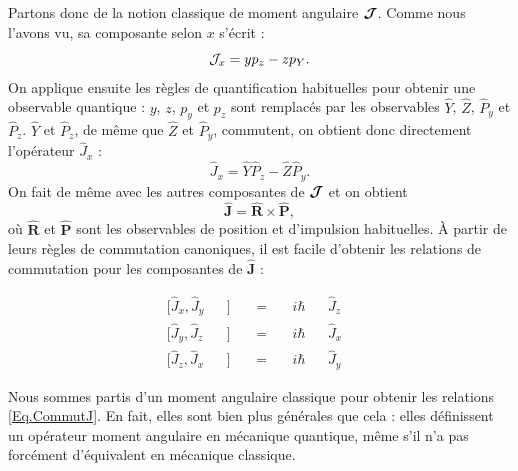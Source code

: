 Partons donc de la notion classique de moment angulaire $\bm{\mathcal{J}}$. Comme nous l'avons vu, sa composante selon $x$ s'écrit :
\begin{equation*}
\mathcal{J}_x=yp_z-zp_Y.
\end{equation*}
On applique ensuite les règles de quantification habituelles pour obtenir une observable quantique : $y$, $z$, $p_y$ et $p_z$ sont remplacés par les observables $\hat{Y}$, $\hat{Z}$, $\hat{P}_y$ et $\hat{P}_z$. $\hat{Y}$ et $\hat{P}_z$, de même que $\hat{Z}$ et $\hat{P}_y$, commutent, on obtient donc directement l'opérateur $\hat{J}_x$ :
\begin{equation*}
\hat{J}_x=\hat{Y}\hat{P}_z-\hat{Z}\hat{P}_y.
\end{equation*}
On fait de même avec les autres composantes de $\bm{\mathcal{J}}$ et on obtient 
\begin{equation*}
\bm{\hat{J}}=\bm{\hat{R}}\times\bm{\hat{P}},
\end{equation*}
où $\bm{\hat{R}}$ et $\bm{\hat{P}}$ sont les observables de position et d'impulsion habituelles. \`A partir de leurs règles de commutation canoniques, il est facile d'obtenir les relations de commutation pour les composantes de $\bm{\hat{J}}$ :

\begin{equation}
\begin{alignedat}{6}
&[\hat{J}_x,\hat{J}_y&&]~&&=~&&i\hbar &&\hat{J}_z&&\\
&[\hat{J}_y,\hat{J}_z&&]~&&=~&&i\hbar &&\hat{J}_x&&\\
&[\hat{J}_z,\hat{J}_x&&]~&&=~&&i\hbar &&\hat{J}_y&&
\end{alignedat}
\label{Eq.CommutJ}
\end{equation}

Nous sommes partis d'un moment angulaire classique pour obtenir les relations \ref{Eq.CommutJ}. En fait, elles sont bien plus générales que cela : elles définissent un opérateur moment angulaire en mécanique quantique, même s'il n'a pas forcément d'équivalent en mécanique classique.

